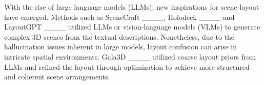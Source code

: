With the rise of large language models (LLMs), new inspirations for scene layout have emerged. Methods such as SceneCraft ____, Holodeck ____ and LayoutGPT ____ utilized LLMs or vision-language models (VLMs) to generate complex 3D scenes from the textual descriptions. Nonetheless, due to the hallucination issues inherent in large models, layout confusion can arise in intricate spatial environments. Gala3D ____ utilized coarse layout priors from LLMs and refined the layout through optimization to achieve more structured and coherent scene arrangements. 

